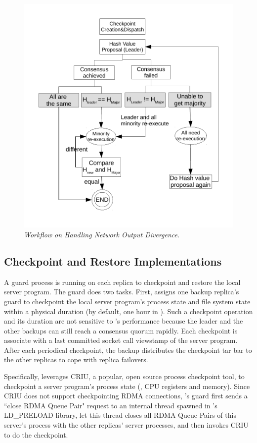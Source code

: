 

\begin{figure}[t]
\centering
\includegraphics[width=.5\textwidth]{figures/output-divergence}
\vspace{-.20in}
\caption{{\em Workflow on Handling Network Output Divergence.}} 
\label{fig:divergence}
\vspace{-.05in}
\end{figure}

\subsection{Checkpoint and Restore Implementations} \label{sec:checkpoint}

A guard process is running on each replica to checkpoint and restore the local 
server program. The guard does two tasks. First, \xxx assigns one backup 
replica's guard to checkpoint the local server program's process state and file 
system state within a physical duration \tcheckpoint (by default, one hour in 
\xxx). Such a checkpoint operation and its duration are not sensitive to \xxx's 
performance because the leader and the other backups can still reach a 
consensus quorum rapidly. Each checkpoint is associate with a last committed 
socket call viewstamp of the server program. After each periodical checkpoint, 
the backup distributes the checkpoint tar bar to the other replicas to cope 
with replica failovers.

Specifically, \xxx leverages CRIU, a popular, open source process checkpoint 
tool, to checkpoint a server program's process state (\eg, CPU registers and 
memory). Since CRIU does not support checkpointing RDMA connections, \xxx's 
guard first sends a ``close RDMA Queue Pair" request to an \xxx internal thread 
spawned in \xxx's LD\_PRELOAD library, let this thread closes all RDMA Queue 
Pairs of this server's process with the other replicas' server processes, and 
then invokes CRIU to do the checkpoint.

